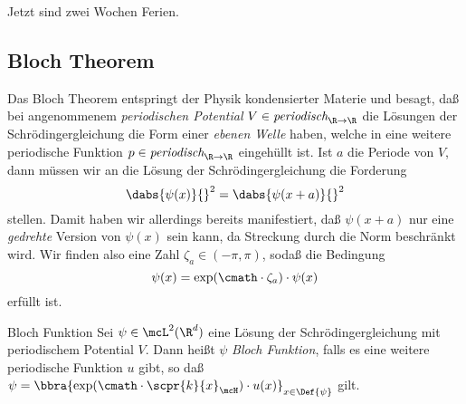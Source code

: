 \documentclass{subfiles}
\begin{document}
    Jetzt sind zwei Wochen Ferien. 
    \subsection*{Bloch Theorem}
        Das Bloch Theorem entspringt der Physik kondensierter Materie und besagt, daß bei angenommenem \emph{periodischen Potential} $V\in\textit{periodisch}_{\R\to\R}$ die Lösungen der Schrödingergleichung die Form einer \emph{ebenen Welle} haben, welche in eine weitere periodische Funktion $p\in\textit{periodisch}_{\R\to\R}$ eingehüllt ist. Ist $a$ die Periode von $V$, dann müssen wir an die Lösung der Schrödingergleichung die Forderung
        \[\dabs{\psi(x)}{}^2 = \dabs{\psi(x + a)}{}^2\]
        stellen. Damit haben wir allerdings bereits manifestiert, daß $\psi(x + a)$ nur eine \emph{gedrehte} Version von $\psi(x)$ sein kann, da Streckung durch die Norm beschränkt wird. Wir finden also eine Zahl $\zeta_a\in(-\pi,\pi)$, sodaß die Bedingung
        \[\psi(x) = \exp(\cmath\cdot\zeta_a)\cdot\psi(x)\]
        erfüllt ist. 
        \begin{mdef}{Bloch Funktion}
            Sei $\psi\in\mcL^2(\R^d)$ eine Lösung der Schrödingergleichung mit periodischem Potential $V$. Dann heißt $\psi$ \emph{Bloch Funktion}, falls es eine weitere periodische Funktion $u$ gibt, so daß $\psi = \bbra{\exp(\cmath\cdot\scpr{k}{x}_\mcH)\cdot u(x)}_{x\in\Def{\psi}}$ gilt.
        \end{mdef}
        
        
\end{document}
